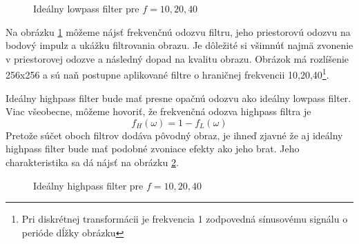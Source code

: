 \begin{figure}[htp]
    \def\path{obrazky/informatika/digitalne_filtre}
    \centering
    \caption{Ideálny lowpass filter pre $f=10,20,40$}
    \label{fig:ideal_lowpass_filter}
\end{figure}

Na obrázku \ref{fig:ideal_lowpass_filter} môžeme nájsť
frekvenčnú odozvu filtru, jeho priestorovú odozvu na bodový impulz a
ukážku filtrovania obrazu. Je dôležité si všimnúť najmä zvonenie v
priestorovej odozve a následný dopad na kvalitu obrazu. Obrázok má
rozlíšenie 256x256 a sú naň postupne aplikované filtre o hraničnej
frekvencii 10,20,40\footnote{Pri diskrétnej transformácii je
frekvencia 1 zodpovedná sínusovému signálu o perióde dĺžky obrázku}.

Ideálny highpass filter bude mať presne opačnú odozvu ako ideálny
lowpass filter. Viac všeobecne, môžeme hovoriť, že frekvenčná odozva
highpass filtra je
\begin{equation}
    f_H(\omega) = 1 - f_L(\omega)
    \label{eq:highpass_filter}
\end{equation}
Pretože súčet oboch filtrov dodáva pôvodný obraz, je ihneď zjavné že
aj ideálny highpass filter bude mať podobné zvoniace efekty ako jeho
brat. Jeho charakteristika sa dá nájsť na obrázku
\ref{fig:ideal_highpass_filter}.

\begin{figure}[htp]
    \def\path{obrazky/informatika/digitalne_filtre}
    \centering
    \caption{Ideálny highpass filter pre $f=10,20,40$}
    \label{fig:ideal_highpass_filter}
\end{figure}

